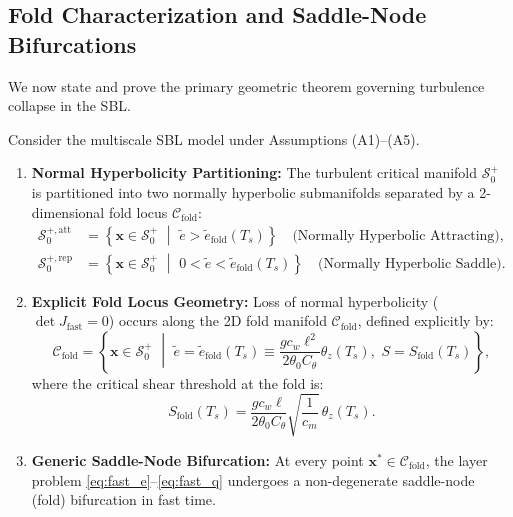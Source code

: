 \subsection{Fold Characterization and Saddle-Node Bifurcations}

We now state and prove the primary geometric theorem governing turbulence collapse in the SBL.

\begin{theorem}
\label{thm:fold_characterization}
Consider the multiscale SBL model under Assumptions \textnormal{(A1)--(A5)}.
\begin{enumerate}
    \item \textbf{Normal Hyperbolicity Partitioning:} The turbulent critical manifold $\mathcal{S}_0^+$ is partitioned into two normally hyperbolic submanifolds separated by a 2-dimensional fold locus $\mathcal{C}_{\mathrm{fold}}$:
    \begin{align}
    \mathcal{S}_0^{+,\mathrm{att}} &= \left\{ \mathbf{x} \in \mathcal{S}_0^+ \,\,\middle\vert\,\, \tilde e > \tilde e_{\mathrm{fold}}(T_s) \right\} \quad \text{(Normally Hyperbolic Attracting)}, \\
    \mathcal{S}_0^{+,\mathrm{rep}} &= \left\{ \mathbf{x} \in \mathcal{S}_0^+ \,\,\middle\vert\,\, 0 < \tilde e < \tilde e_{\mathrm{fold}}(T_s) \right\} \quad \text{(Normally Hyperbolic Saddle)}.
    \end{align}

    \item \textbf{Explicit Fold Locus Geometry:} Loss of normal hyperbolicity ($\det J_{\mathrm{fast}} = 0$) occurs along the 2D fold manifold $\mathcal{C}_{\mathrm{fold}}$, defined explicitly by:
    \begin{equation}
    \mathcal{C}_{\mathrm{fold}} = \left\{ \mathbf{x} \in \mathcal{S}_0^+ \,\,\middle\vert\,\, \tilde e = \tilde e_{\mathrm{fold}}(T_s) \equiv \frac{g c_w \ell^2}{2\theta_0 C_\theta} \theta_z(T_s), \,\, S = S_{\mathrm{fold}}(T_s) \right\},
    \end{equation}
    where the critical shear threshold at the fold is:
    \begin{equation}
    S_{\mathrm{fold}}(T_s) = \frac{g c_w \ell}{2\theta_0 C_\theta} \sqrt{\frac{1}{c_m}} \, \theta_z(T_s).
    \label{eq:S_fold}
    \end{equation}

    \item \textbf{Generic Saddle-Node Bifurcation:} At every point $\mathbf{x}^* \in \mathcal{C}_{\mathrm{fold}}$, the layer problem \eqref{eq:fast_e}--\eqref{eq:fast_q} undergoes a non-degenerate saddle-node (fold) bifurcation in fast time.
\end{enumerate}
\end{theorem}


